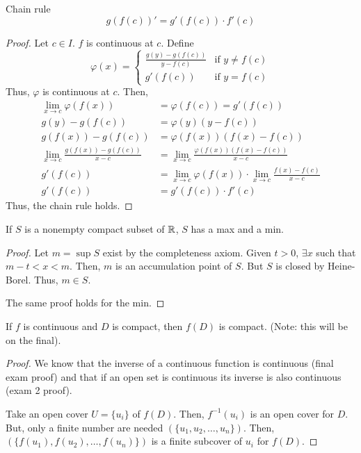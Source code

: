 \begin{theorem}{Chain rule}{}
    $$g(f(c))' = g'(f(c)) \cdot f'(c)$$
\end{theorem}
\begin{proof}
    Let $c \in I$. $f$ is continuous at $c$. Define
    $$\varphi(x) = 
    \begin{cases}
        \frac{g(y) - g(f(c))}{y - f(c)} & \text{if } y \neq f(c) \\
        g'(f(c)) & \text{if } y = f(c)
    \end{cases}$$
    Thus, $\varphi$ is continuous at $c$. Then,
    \begin{align*}
        \lim_{x \to c} \varphi(f(x)) &= \varphi(f(c)) = g'(f(c)) \\
        g(y) - g(f(c)) &= \varphi(y)(y - f(c)) \\
        g(f(x)) - g(f(c)) &= \varphi(f(x))(f(x) - f(c)) \\
        \lim_{x \to c} \frac{g(f(x)) - g(f(c))}{x - c} &= \lim_{x \to c} \frac{\varphi(f(x))(f(x) - f(c))}{x - c} \\
        g'(f(c)) &= \lim_{x \to c} \varphi(f(x)) \cdot \lim_{x \to c} \frac{f(x) - f(c)}{x - c} \\
        g'(f(c)) &= g'(f(c)) \cdot f'(c)
    \end{align*}
    Thus, the chain rule holds.
\end{proof}
\pagebreak

\begin{theorem}
    If $S$ is a nonempty compact subset of $\mathbb{R}$, $S$ has a max and a min.
\end{theorem}
\begin{proof}
    Let $m = \sup S$ exist by the completeness axiom. Given $t > 0$, $\exists x$ such that $m - t < x < m$. Then, $m$ is an accumulation point of $S$. But $S$ is closed by Heine-Borel. Thus, $m \in S$.

    The same proof holds for the min.
\end{proof}

\begin{theorem}
    If $f$ is continuous and $D$ is compact, then $f(D)$ is compact. (Note: this will be on the final).
\end{theorem}
\begin{proof}
    We know that the inverse of a continuous function is continuous (final exam proof) and that if an open set is continuous its inverse is also continuous (exam 2 proof).
    
    Take an open cover $U = \{u_i\}$ of $f(D)$. Then, $f^{-1}(u_i)$ is an open cover for $D$. But, only a finite number are needed $(\{u_1, u_2, \ldots, u_n\})$. Then, $(\{f(u_1), f(u_2), \ldots, f(u_n)\})$ is a finite subcover of $u_i$ for $f(D)$.
\end{proof}

